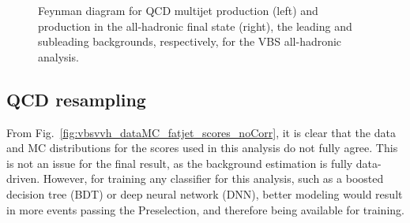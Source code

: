 \begin{figure}[htb]
    \centering
    \quad
    \caption[Feynman diagrams for QCD multijet and \ttbar production]{
        Feynman diagram for QCD multijet production (left) and \ttbar production in the all-hadronic final state (right), the leading and subleading backgrounds, respectively, for the VBS \VVH all-hadronic analysis. 
    }
    \label{fig:vbsvvh_bkgs} %
\end{figure}

\subsection{QCD \ParticleNet resampling}
From Fig.~\ref{fig:vbsvvh_dataMC_fatjet_scores_noCorr}, it is clear that the data and MC distributions for the \ParticleNet scores used in this analysis do not fully agree. 
This is not an issue for the final result, as the background estimation is fully data-driven. 
However, for training any classifier for this analysis, such as a boosted decision tree (BDT) or deep neural network (DNN), better modeling would result in more events passing the Preselection, and therefore being available for training.

